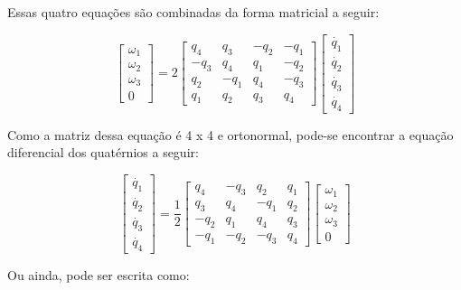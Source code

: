 Essas quatro equações são combinadas da forma matricial a seguir:

\begin{equation}
\begin{bmatrix}\omega_1 \\ \omega_2 \\ \omega_3 \\ 0\end{bmatrix}=2
\begin{bmatrix}q_4&q_3&-q_2&-q_ 1\\ -q_3&q_4&q_1&-q_2 \\ q_2&-q_1&q_4&-q_ 3\\q_1&q_2&q_3&q_4\end{bmatrix}
\begin{bmatrix}\dot{q_1} \\ \dot{q_2 }\\ \dot{q_3} \\\dot{q_4}\end{bmatrix}
\end{equation}

Como a matriz dessa equação é 4 x 4 e ortonormal, pode-se encontrar a equação diferencial dos quatérnios a seguir:

\begin{equation}\begin{bmatrix}\dot{q_1} \\ \dot{q_2 }\\ \dot{q_3} \\\dot{q_4}\end{bmatrix}=\frac{1}{2}
\begin{bmatrix}
q_4&-q_3&q_2&q_ 1\\
q_3&q_4&-q_1&q_2 \\
-q_2&q_1&q_4&q_ 3\\
-q_1&-q_2&-q_3&q_4\end{bmatrix}
\begin{bmatrix}\omega_1 \\ \omega_2 \\ \omega_3 \\ 0\end{bmatrix}\end{equation}

Ou ainda, pode ser escrita como:

